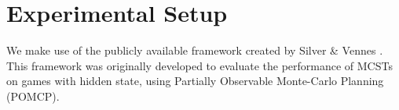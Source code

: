 
\section{Experimental Setup}
We make use of the publicly available framework created by Silver \& Vennes \cite{silver2010monte}. This framework was originally developed to evaluate the performance of MCSTs on games with hidden state, using Partially Observable Monte-Carlo Planning (POMCP).